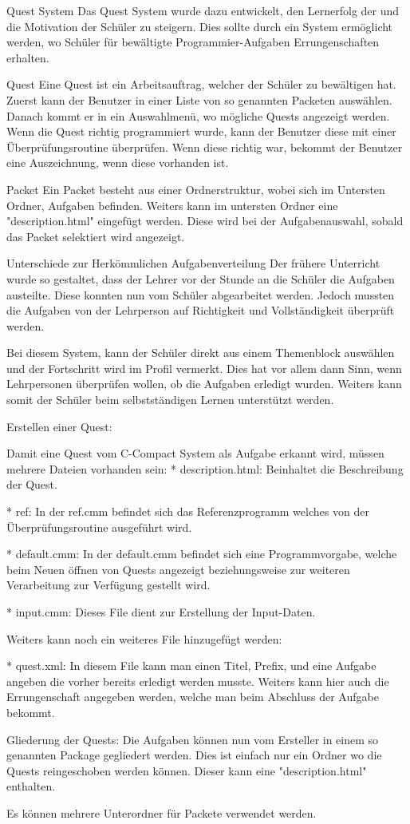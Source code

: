 Quest System
Das Quest System wurde dazu entwickelt, den Lernerfolg der und die Motivation der Schüler zu steigern. Dies sollte durch ein System ermöglicht werden, wo Schüler für bewältigte Programmier-Aufgaben Errungenschaften erhalten.

Quest
Eine Quest ist ein Arbeitsauftrag, welcher der Schüler zu bewältigen hat.
Zuerst kann der Benutzer in einer Liste von so genannten Packeten auswählen. Danach kommt er in ein Auswahlmenü, wo mögliche Quests angezeigt werden.
Wenn die Quest richtig programmiert wurde, kann der Benutzer diese mit einer Überprüfungsroutine überprüfen. Wenn diese richtig war, bekommt der Benutzer eine Auszeichnung, wenn diese vorhanden ist.

Packet
Ein Packet besteht aus einer Ordnerstruktur, wobei sich im Untersten Ordner, Aufgaben befinden. Weiters kann im untersten Ordner eine "description.html" eingefügt werden. Diese wird bei der Aufgabenauswahl, sobald das Packet selektiert wird angezeigt.

Unterschiede zur Herkömmlichen Aufgabenverteilung
Der frühere Unterricht wurde so gestaltet, dass der Lehrer vor der Stunde an die Schüler die Aufgaben austeilte. Diese konnten nun vom Schüler abgearbeitet werden. Jedoch mussten die Aufgaben von der Lehrperson auf Richtigkeit und Vollständigkeit überprüft werden.

Bei diesem System, kann der Schüler direkt aus einem Themenblock auswählen und der Fortschritt wird im Profil vermerkt. Dies hat vor allem dann Sinn, wenn Lehrpersonen überprüfen wollen, ob die Aufgaben erledigt wurden. Weiters kann somit der Schüler beim selbstständigen Lernen unterstützt werden.

Erstellen einer Quest:

Damit eine Quest vom C-Compact System als Aufgabe erkannt wird, müssen mehrere Dateien vorhanden sein:
* description.html:
Beinhaltet die Beschreibung der Quest.

* ref:
In der ref.cmm befindet sich das Referenzprogramm welches von der Überprüfungsroutine ausgeführt wird.

* default.cmm:
In der default.cmm befindet sich eine Programmvorgabe, welche beim Neuen öffnen von Quests angezeigt beziehungsweise zur weiteren Verarbeitung zur Verfügung gestellt wird.

* input.cmm:
Dieses File dient zur Erstellung der Input-Daten.

Weiters kann noch ein weiteres File hinzugefügt werden:

* quest.xml:
In diesem File kann man einen Titel, Prefix, und eine Aufgabe angeben die vorher bereits erledigt werden musste. Weiters kann hier auch die Errungenschaft angegeben werden, welche man beim Abschluss der Aufgabe bekommt.

Gliederung der Quests:
Die Aufgaben können nun vom Ersteller in einem so genannten Package gegliedert werden. Dies ist einfach nur ein Ordner wo die Quests reingeschoben werden können. Dieser kann eine "description.html" enthalten. 

Es können mehrere Unterordner für Packete verwendet werden.

